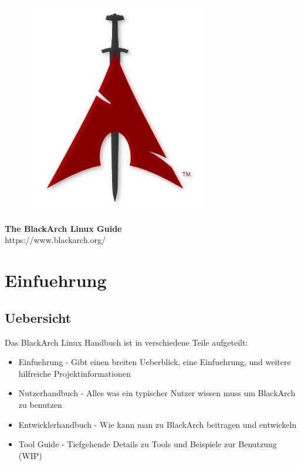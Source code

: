 \documentclass[a4paper, oneside, 11pt]{book}
\begin{document}
\pagestyle{empty}
\begin{center}
\begin{figure}[htbp]
\centering
\vspace{0.5cm}
\includegraphics[width=8cm]{images/logo.png}
\label{fig:logo}
\end{figure}
\vspace{0.5cm}
\Huge{\textbf{The BlackArch Linux Guide}}\\
\vspace{1cm}
\Large{\color{red}https://www.blackarch.org/}\\
\vspace{0.5cm}
\end{center}
\newpage
\tableofcontents
\newpage
\pagestyle{fancy}


\chapter{Einfuehrung}

\section{Uebersicht}
Das BlackArch Linux Handbuch ist in verschiedene Teile aufgeteilt:
\begin{itemize}
\item Einfuehrung - Gibt einen breiten Ueberblick, eine Einfuehrung, und weitere hilfreiche Projektinformationen
\item Nutzerhandbuch - Alles was ein typischer Nutzer wissen muss um BlackArch zu benutzen
\item Entwicklerhandbuch - Wie kann man zu BlackArch beitragen und entwickeln
\item Tool Guide - Tiefgehende Details zu Tools und Beispiele zur Benutzung (WIP)
\end{itemize}
\end{document}
